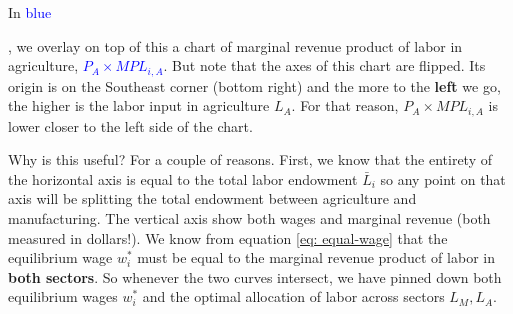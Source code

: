 \documentclass[11pt,letterpaper]{article}
\begin{document}
In \textcolor{blue}{blue}{, we overlay on top of this a chart of marginal revenue product of labor in agriculture, \textcolor{blue}{$P_A \times MPL_{i,A}$}. But note that the axes of this chart are flipped. Its origin is on the Southeast corner (bottom right) and the more to the \textbf{left} we go, the higher is the labor input in agriculture $L_A$. For that reason, $P_A \times MPL_{i,A}$ is lower closer to the left side of the chart.

Why is this useful? For a couple of reasons. First, we know that the entirety of the horizontal axis is equal to the total labor endowment $\bar{L}_i$ so any point on that axis will be splitting the total endowment between agriculture and manufacturing. The vertical axis show both wages and marginal revenue (both measured in dollars!). We know from equation \eqref{eq: equal-wage} that the equilibrium wage $w_i^*$ must be equal to the marginal revenue product of labor in \textbf{both sectors}. So whenever the two curves intersect, we have pinned down both equilibrium wages $w^*_i$ and the optimal allocation of labor across sectors $L_M, L_A$.



\begin{figure}
    \centering
\end{figure}}
\end{document}
